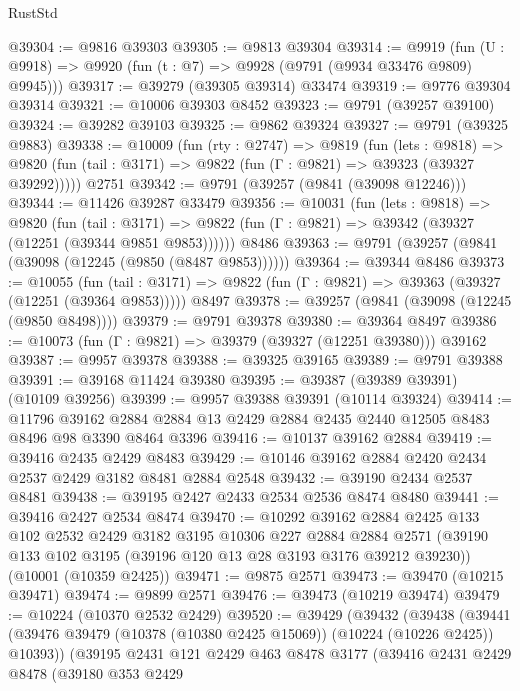 \begin{lexlean}{RustStd}
\begin{coremodule}
@39304 := @9816 @39303
@39305 := @9813 @39304
@39314 := @9919
    (fun (U : @9918) => @9920 (fun (t : @7) => @9928 (@9791 (@9934 @33476 @9809) @9945)))
@39317 := @39279 (@39305 @39314) @33474
@39319 := @9776 @39304 @39314
@39321 := @10006 @39303 @8452
@39323 := @9791 (@39257 @39100)
@39324 := @39282 @39103
@39325 := @9862 @39324
@39327 := @9791 (@39325 @9883)
@39338 := @10009
    (fun (rty : @2747) =>
    @9819
      (fun (lets : @9818) =>
      @9820 (fun (tail : @3171) => @9822 (fun (Γ : @9821) => @39323 (@39327 @39292)))))
    @2751
@39342 := @9791 (@39257 (@9841 (@39098 @12246)))
@39344 := @11426 @39287 @33479
@39356 := @10031
    (fun (lets : @9818) =>
    @9820
      (fun (tail : @3171) =>
      @9822 (fun (Γ : @9821) => @39342 (@39327 (@12251 (@39344 @9851 @9853))))))
    @8486
@39363 := @9791 (@39257 (@9841 (@39098 (@12245 (@9850 (@8487 @9853))))))
@39364 := @39344 @8486
@39373 := @10055
    (fun (tail : @3171) => @9822 (fun (Γ : @9821) => @39363 (@39327 (@12251 (@39364 @9853)))))
    @8497
@39378 := @39257 (@9841 (@39098 (@12245 (@9850 @8498))))
@39379 := @9791 @39378
@39380 := @39364 @8497
@39386 := @10073 (fun (Γ : @9821) => @39379 (@39327 (@12251 @39380))) @39162
@39387 := @9957 @39378
@39388 := @39325 @39165
@39389 := @9791 @39388
@39391 := @39168 @11424 @39380
@39395 := @39387 (@39389 @39391) (@10109 @39256)
@39399 := @9957 @39388 @39391 (@10114 @39324)
@39414 := @11796
    @39162
    @2884
    @2884
    @13
    @2429
    @2884
    @2435
    @2440
    @12505
    @8483
    @8496
    @98
    @3390
    @8464
    @3396
@39416 := @10137 @39162 @2884
@39419 := @39416 @2435 @2429 @8483
@39429 := @10146 @39162 @2884 @2420 @2434 @2537 @2429 @3182 @8481 @2884 @2548
@39432 := @39190 @2434 @2537 @8481
@39438 := @39195 @2427 @2433 @2534 @2536 @8474 @8480
@39441 := @39416 @2427 @2534 @8474
@39470 := @10292
    @39162
    @2884
    @2425
    @133
    @102
    @2532
    @2429
    @3182
    @3195
    @10306
    @227
    @2884
    @2884
    @2571
    (@39190 @133 @102 @3195 (@39196 @120 @13 @28 @3193 @3176 @39212 @39230))
    (@10001 (@10359 @2425))
@39471 := @9875 @2571
@39473 := @39470 (@10215 @39471)
@39474 := @9899 @2571
@39476 := @39473 (@10219 @39474)
@39479 := @10224 (@10370 @2532 @2429)
@39520 := @39429
    (@39432
      (@39438
        (@39441 (@39476 @39479 (@10378 (@10380 @2425 @15069)) (@10224 (@10226 @2425)) @10393))
        (@39195
          @2431
          @121
          @2429
          @463
          @8478
          @3177
          (@39416
            @2431
            @2429
            @8478
            (@39180
              @353
              @2429

\end{coremodule}
\end{lexlean}
